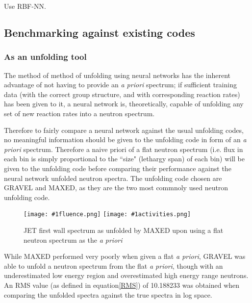 \documentclass[a4paper, 12pt]{article}
\newcommand{\fluenceandactivities}[1]{
\texttt{[image: \#1fluence.png]}
\texttt{[image: \#1activities.png]}
}
\begin{document}
Use RBF-NN.

\subsection{Benchmarking against existing codes}
\subsubsection{As an unfolding tool}
The method of method of unfolding using neural networks has the inherent advantage of not having to provide an \emph{a priori} spectrum; if sufficient training data (with the correct group structure, and with corresponding reaction rates) has been given to it, a neural network is, theoretically, capable of unfolding any set of new reaction rates into a neutron spectrum. 

Therefore to fairly compare a neural network against the usual unfolding codes, no meaningful information should be given to the unfolding code in form of an \emph{a priori} spectrum. Therefore a naive priori of a flat neutron spectrum (i.e. flux in each bin is simply proportional to the ``size" (lethargy span) of each bin) will be given to the unfolding code before comparing their performance against the neural network unfolded neutron spectra. The unfolding code chosen are GRAVEL and MAXED, as they are the two most commnoly used neutron unfolding code. \cite{LWP_LTIS} \cite{bethColling_TBMD}

\begin{figure}
\centering
    \fluenceandactivities{/home/ocean/Documents/GitHubDir/unfolding/unfolding/unfoldingsuite/neuralnetwork/realinputEarlyStopping/comparison/real_fusion_test_gravel_test_001_}
    \caption{JET first wall spectrum as unfolded by MAXED upon using a flat neutron spectrum as the \emph{a priori}}\label{maxed_flat_a_priori_JET}
\end{figure}
    
While MAXED performed very poorly when given a flat \emph{a priori}, GRAVEL was able to unfold a neutron spectrum from the flat \emph{a priori}, though with an underestimated low energy region and overestimated high energy range neutrons.
An RMS value (as defined in equation\ref{RMS}) of 10.188233 was obtained when comparing the unfolded spectra against the true spectra in log space.
\end{document}
